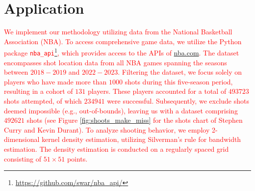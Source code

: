 \section{Application} %
\label{sec:application}

\textcolor{red}{We implement our methodology utilizing data from the National Basketball Association (NBA). To access comprehensive game data, we utilize the Python package \texttt{nba\_api}\footnote{\url{https://github.com/swar/nba_api/}}, which provides access to the APIs of \url{nba.com}. The dataset encompasses shot location data from all NBA games spanning the seasons between $2018-2019$ and $2022-2023$. Filtering the dataset, we focus solely on players who have made more than $1000$ shots during this five-season period, resulting in a cohort of $131$ players. These players accounted for a total of $493723$ shots attempted, of which $234941$ were successful. Subsequently, we exclude shots deemed impossible (e.g., out-of-bounds), leaving us with a dataset comprising $492621$ shots (see Figure \ref{fig:shoots_make_miss} for the shots chart of Stephen Curry and Kevin Durant). To analyze shooting behavior, we employ 2-dimensional kernel density estimation, utilizing Silverman's rule \citep{silvermanDensityEstimationStatistics1986} for bandwidth estimation. The density estimation is conducted on a regularly spaced grid consisting of $51 \times 51$ points.}

